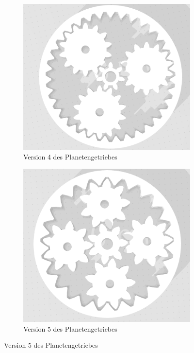 \begin{figure}[H]
	\centering
	\begin{subfigure}[b]{0.4\textwidth}
		\includegraphics[width=\textwidth]{bilder/GetriebeVersion4-1.png}
		\caption{Version 4 des Planetengetriebes}
		\label{bild:gearversion4-1}
	\end{subfigure}
	\hspace{0.1\textwidth}%
	\begin{subfigure}[b]{0.4\textwidth}
		\includegraphics[width=\textwidth]{bilder/GetriebeVersion4-2.png}
		\caption{Version 5 des Planetengetriebes}
		\label{bild:gearversion4-2}
	\end{subfigure}



\end{figure}
